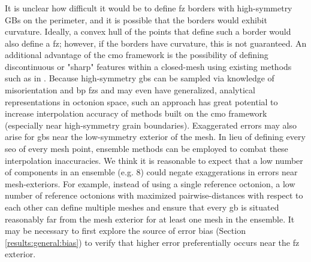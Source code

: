 \documentclass[preprint,12pt]{elsarticle}
\begin{document}
\subsubsection{}
It is unclear how difficult it would be to define \gls{fz} borders with high-symmetry GBs on the perimeter, and it is possible that the borders would exhibit curvature. Ideally, a convex hull of the points that define such a border would also define a \gls{fz}; however, if the borders have curvature, this is not guaranteed. An additional advantage of the \gls{cmo} framework is the possibility of defining discontinuous or "sharp" features within a closed-mesh using existing methods such as in \cite{tianNonUniformSubdivisionSurfaces2020}. Because high-symmetry \glspl{gb} can be sampled via knowledge of misorientation and \gls{bp} \glspl{fz} and may even have generalized, analytical representations in octonion space, such an approach has great potential to increase interpolation accuracy of methods built on the \gls{cmo} framework (especially near high-symmetry grain boundaries). Exaggerated errors may also arise for \glspl{gb} near the low-symmetry exterior of the mesh. In lieu of defining every \gls{seo} of every mesh point, ensemble methods can be employed to combat these interpolation inaccuracies. We think it is reasonable to expect that a low number of components in an ensemble (e.g. 8) could negate exaggerations in errors near mesh-exteriors. For example, instead of using a single reference octonion, a low number of reference octonions with maximized pairwise-distances \cite{dolanBenchmarkingOptimizationSoftware2004,ConstrainedElectrostaticNonlinear2020} with respect to each other can define multiple meshes and ensure that every \gls{gb} is situated reasonably far from the mesh exterior for at least one mesh in the ensemble. It may be necessary to first explore the source of error bias (Section \ref{results:general:bias}) to verify that higher error preferentially occurs near the \gls{fz} exterior.
\end{document}
